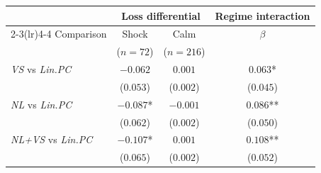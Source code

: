 \begin{tabular}{lccc}
\toprule
 & \multicolumn{2}{c}{Loss differential} & Regime interaction \\
\cmidrule(lr){2-3}\cmidrule(lr){4-4}
Comparison & Shock & Calm & $\beta$ \\
 & ($n{=}72$) & ($n{=}216$) & \\
\midrule
\emph{VS} vs \emph{Lin.PC} & $-0.062$ & $0.001$ & $0.063$* \\
 & \footnotesize($0.053$) & \footnotesize($0.002$) & \footnotesize($0.045$) \\[4pt]
\emph{NL} vs \emph{Lin.PC} & $-0.087$* & $-0.001$ & $0.086$** \\
 & \footnotesize($0.062$) & \footnotesize($0.002$) & \footnotesize($0.050$) \\[4pt]
\emph{NL+VS} vs \emph{Lin.PC} & $-0.107$* & $0.001$ & $0.108$** \\
 & \footnotesize($0.065$) & \footnotesize($0.002$) & \footnotesize($0.052$) \\[4pt]
\bottomrule
\end{tabular}
